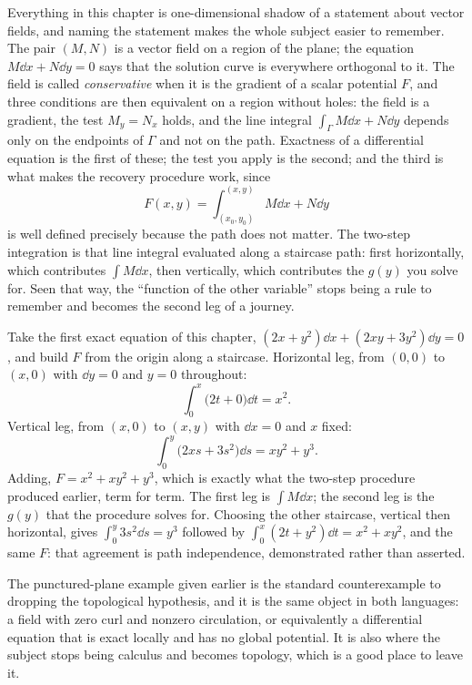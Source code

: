 Everything in this chapter is one-dimensional shadow of a statement about vector fields, and naming the statement makes the whole subject easier to remember. The pair $(M,N)$ is a vector field on a region of the plane; the equation $M\dd x+N\dd y=0$ says that the solution curve is everywhere orthogonal to it. The field is called \emph{conservative} when it is the gradient of a scalar potential $F$, and three conditions are then equivalent on a region without holes: the field is a gradient, the test $M_y=N_x$ holds, and the line integral $\int_\Gamma M\dd x+N\dd y$ depends only on the endpoints of $\Gamma$ and not on the path. Exactness of a differential equation is the first of these; the test you apply is the second; and the third is what makes the recovery procedure work, since
\[F(x,y)=\int_{(x_0,y_0)}^{(x,y)}M\dd x+N\dd y\]
is well defined precisely because the path does not matter. The two-step integration is that line integral evaluated along a staircase path: first horizontally, which contributes $\int M\dd x$, then vertically, which contributes the $g(y)$ you solve for. Seen that way, the ``function of the other variable'' stops being a rule to remember and becomes the second leg of a journey.

\begin{worked}
Take the first exact equation of this chapter, $(2x+y^{2})\dd x+(2xy+3y^{2})\dd y=0$, and build $F$ from the origin along a staircase. Horizontal leg, from $(0,0)$ to $(x,0)$ with $\dd y=0$ and $y=0$ throughout:
\[\int_0^{x}\bigl(2t+0\bigr)\dd t=x^{2}.\]
Vertical leg, from $(x,0)$ to $(x,y)$ with $\dd x=0$ and $x$ fixed:
\[\int_0^{y}\bigl(2xs+3s^{2}\bigr)\dd s=xy^{2}+y^{3}.\]
Adding, $F=x^{2}+xy^{2}+y^{3}$, which is exactly what the two-step procedure produced earlier, term for term. The first leg is $\int M\dd x$; the second leg is the $g(y)$ that the procedure solves for. Choosing the other staircase, vertical then horizontal, gives $\int_0^{y}3s^{2}\dd s=y^{3}$ followed by $\int_0^{x}(2t+y^{2})\dd t=x^{2}+xy^{2}$, and the same $F$: that agreement is path independence, demonstrated rather than asserted.
\end{worked}

The punctured-plane example given earlier is the standard counterexample to dropping the topological hypothesis, and it is the same object in both languages: a field with zero curl and nonzero circulation, or equivalently a differential equation that is exact locally and has no global potential. It is also where the subject stops being calculus and becomes topology, which is a good place to leave it.

